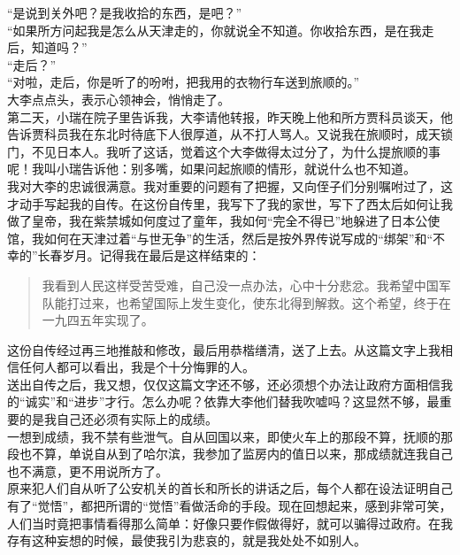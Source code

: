 “是说到关外吧？是我收拾的东西，是吧？”\\

“如果所方问起我是怎么从天津走的，你就说全不知道。你收拾东西，是在我走后，知道吗？”\\

“走后？”\\

“对啦，走后，你是听了的吩咐，把我用的衣物行车送到旅顺的。”\\

大李点点头，表示心领神会，悄悄走了。\\

第二天，小瑞在院子里告诉我，大李请他转报，昨天晚上他和所方贾科员谈天，他告诉贾科员我在东北时待底下人很厚道，从不打人骂人。又说我在旅顺时，成天锁门，不见日本人。我听了这话，觉着这个大李做得太过分了，为什么提旅顺的事呢！我叫小瑞告诉他：别多嘴，如果问起旅顺的情形，就说什么也不知道。\\

我对大李的忠诚很满意。我对重要的问题有了把握，又向侄子们分别嘱咐过了，这才动手写起我的自传。在这份自传里，我写下了我的家世，写下了西太后如何让我做了皇帝，我在紫禁城如何度过了童年，我如何“完全不得已”地躲进了日本公使馆，我如何在天津过着“与世无争”的生活，然后是按外界传说写成的“绑架”和“不幸的”长春岁月。记得我在最后是这样结束的：\\

\begin{quote}
	我看到人民这样受苦受难，自己没一点办法，心中十分悲忿。我希望中国军队能打过来，也希望国际上发生变化，使东北得到解救。这个希望，终于在一九四五年实现了。\\
\end{quote}

这份自传经过再三地推敲和修改，最后用恭楷缮清，送了上去。从这篇文字上我相信任何人都可以看出，我是个十分悔罪的人。\\

送出自传之后，我又想，仅仅这篇文字还不够，还必须想个办法让政府方面相信我的“诚实”和“进步”才行。怎么办呢？依靠大李他们替我吹嘘吗？这显然不够，最重要的是我自己还必须有实际上的成绩。\\

一想到成绩，我不禁有些泄气。自从回国以来，即使火车上的那段不算，抚顺的那段也不算，单说自从到了哈尔滨，我参加了监房内的值日以来，那成绩就连我自己也不满意，更不用说所方了。\\

原来犯人们自从听了公安机关的首长和所长的讲话之后，每个人都在设法证明自己有了“觉悟”，都把所谓的“觉悟”看做活命的手段。现在回想起来，感到非常可笑，人们当时竟把事情看得那么简单：好像只要作假做得好，就可以骗得过政府。在我存有这种妄想的时候，最使我引为悲哀的，就是我处处不如别人。\\

